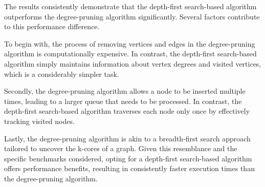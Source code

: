 The results consistently demonstrate that the depth-first search-based algorithm outperforms the degree-pruning algorithm significantly. Several factors contribute to this performance difference. 

To begin with, the process of removing vertices and edges in the degree-pruning algorithm is computationally expensive. In contrast, the depth-first search-based algorithm simply maintains information about vertex degrees and visited vertices, which is a considerably simpler task. 

Secondly, the degree-pruning algorithm allows a node to be inserted multiple times, leading to a larger queue that needs to be processed. In contrast, the depth-first search-based algorithm traverses each node only once by effectively tracking visited nodes.

Lastly, the degree-pruning algorithm is akin to a breadth-first search approach tailored to uncover the k-cores of a graph. Given this resemblance and the specific benchmarks considered, opting for a depth-first search-based algorithm offers performance benefits, resulting in consistently faster execution times than the degree-pruning algorithm.